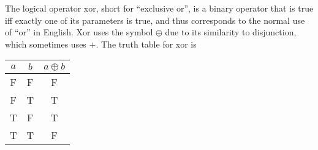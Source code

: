 \documentclass[12pt]{article}
\begin{document}

The logical operator xor, short for ``exclusive or'', is a binary operator that is true iff exactly one of its parameters is true, and thus corresponds to the normal use of ``or'' in English. Xor uses the symbol $\oplus$ due to its similarity to disjunction, which sometimes uses $+$. The truth table for xor is

\begin{center}
\begin{tabular}{ccc}
$a$ & $b$ & $a \oplus b$ \\
\hline
F & F & F \\
F & T & T \\
T & F & T \\
T & T & F
\end{tabular}
\end{center}
\end{document}
